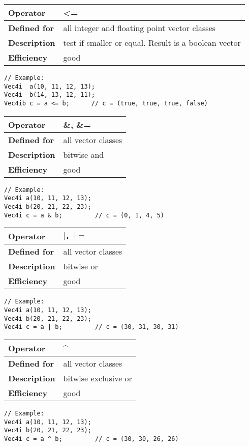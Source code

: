 \documentclass[vcl_manual.tex]{subfiles}
\begin{document}
\begin{tabular}{|p{25mm}|p{100mm}|}
\hline
\bfseries Operator & \textless= \\ \hline
\bfseries Defined for & all integer and floating point vector classes \\ \hline
\bfseries Description & test if smaller or equal. Result is a boolean vector \\ \hline
\bfseries Efficiency & good \\ \hline
\end{tabular}
\begin{lstlisting}[frame=none]
// Example:
Vec4i  a(10, 11, 12, 13);
Vec4i  b(14, 13, 12, 11);
Vec4ib c = a <= b;      // c = (true, true, true, false)
\end{lstlisting}



\begin{tabular}{|p{25mm}|p{100mm}|}
\hline
\bfseries Operator & \&, \&= \\ \hline
\bfseries Defined for & all vector classes \\ \hline
\bfseries Description & bitwise and \\ \hline
\bfseries Efficiency & good \\ \hline
\end{tabular}
\begin{lstlisting}[frame=none]
// Example:
Vec4i a(10, 11, 12, 13);
Vec4i b(20, 21, 22, 23);
Vec4i c = a & b;         // c = (0, 1, 4, 5)
\end{lstlisting}


\begin{tabular}{|p{25mm}|p{100mm}|}
\hline
\bfseries Operator & \texttt{$\vert$, $\vert=$} \\ \hline
\bfseries Defined for & all vector classes \\ \hline
\bfseries Description & bitwise or \\ \hline
\bfseries Efficiency & good \\ \hline
\end{tabular}
\begin{lstlisting}[frame=none]
// Example:
Vec4i a(10, 11, 12, 13);
Vec4i b(20, 21, 22, 23);
Vec4i c = a | b;         // c = (30, 31, 30, 31)
\end{lstlisting}


\begin{tabular}{|p{25mm}|p{100mm}|}
\hline
\bfseries Operator & \textasciicircum \\ \hline
\bfseries Defined for & all vector classes \\ \hline
\bfseries Description & bitwise exclusive or \\ \hline
\bfseries Efficiency & good \\ \hline
\end{tabular}
\begin{lstlisting}[frame=none]
// Example:
Vec4i a(10, 11, 12, 13);
Vec4i b(20, 21, 22, 23);
Vec4i c = a ^ b;         // c = (30, 30, 26, 26)
\end{lstlisting}
\end{document}
